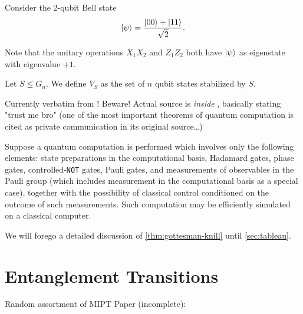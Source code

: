 Consider the 2-qubit Bell state
\begin{align}
  \ket{\psi} = \frac{\ket{00} + \ket{11}}{\sqrt{2}} 
.\end{align}

Note that the unitary operations $X_1 X_2$ and $Z_1 Z_2$ both have $\ket{\psi}$
as eigenstate with eigenvalue $+1$.


\begin{defn}
  Let $S\leq G_n$. We define $V_S$ as the set of $n$ qubit states stabilized by
  $S$.
\end{defn}

Currently verbatim from \cite{nielsenQuantumComputationQuantum2010}! Beware!
Actual source is \emph{inside}
\cite{gottesmanHeisenbergRepresentationQuantum1998}, basically stating "trust
me bro" (one of the most important theorems of quantum computation is cited as
private communication in its original source\ldots)
\begin{thm}\label{thm:gottesman-knill}
  Suppose a quantum computation is performed which involves only the following
  elements: state preparations in the computational basis, Hadamard gates,
  phase gates, controlled-\verb|NOT| gates, Pauli gates, and measurements of
  observables in the Pauli group (which includes measurement in the
  computational basis as a special case), together with the possibility of
  classical control conditioned on the outcome of such measurements. Such
  computation may be efficiently simulated on a classical computer.
\end{thm}
We will forego a detailed discussion of \cref{thm:gottesman-knill} until
\cref{sec:tableau}. 

\section{Entanglement Transitions}\label{sec:ent-trans}

Random assortment of MIPT Paper (incomplete):

